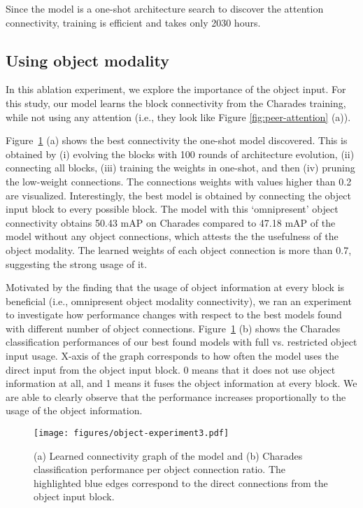 \documentclass[runningheads]{llncs}
\begin{document}
Since the model is a one-shot architecture search to discover the attention connectivity, training is efficient and takes only 2030 hours. 






\subsection{Using object modality}
\label{subsec:object-abl}

In this ablation experiment, we explore the importance of the object input. For this study, our model learns the block connectivity from the Charades training, while not using any attention (i.e., they look like Figure \ref{fig:peer-attention} (a)).





Figure~\ref{fig:per-connection-ratio} (a) shows the best connectivity the one-shot model discovered. This is obtained by (i) evolving the blocks with 100 rounds of architecture evolution, (ii) connecting all blocks, (iii) training the weights in one-shot, and then (iv) pruning the low-weight connections. The connections weights  with values higher than 0.2 are visualized. 
Interestingly, the best model is obtained by connecting the object input block to every possible block. The model with this `omnipresent' object connectivity obtains 50.43 mAP on Charades compared to 47.18 mAP of the model without any object connections, which attests the the usefulness of the object modality. The learned weights of each object connection is more than 0.7, suggesting the strong usage of it.

Motivated by the finding that the usage of object information at every block is beneficial (i.e., omnipresent object modality connectivity), we ran an experiment to investigate how performance changes with respect to the best models found with different number of object connections. Figure~\ref{fig:per-connection-ratio} (b) shows the Charades classification performances of our best found models with full vs. restricted object input usage. X-axis of the graph corresponds to how often the model uses the direct input from the object input block. 0 means that it does not use object information at all, and 1 means it fuses the object information at every block. We are able to clearly observe that the performance increases proportionally to the usage of the object information.



\begin{figure}
  \centering
  \texttt{[image: figures/object-experiment3.pdf]}
  \caption{(a) Learned connectivity graph of the model and (b) Charades classification performance per object connection ratio. The highlighted blue edges correspond to the direct connections from the object input block.}
  \label{fig:per-connection-ratio}
\end{figure}
\end{document}
